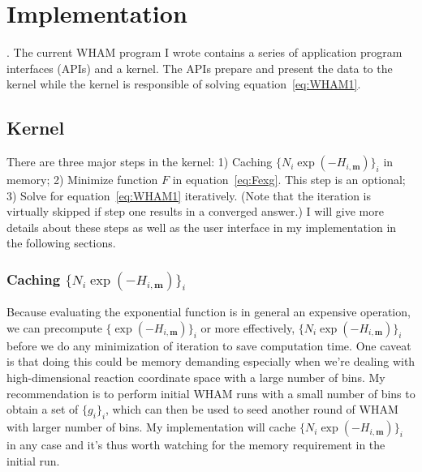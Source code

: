 \section{Implementation}
. The current WHAM
program I wrote contains a series of application program interfaces (APIs) and
a kernel. The APIs prepare and present the data to the kernel while the kernel
is responsible of solving equation~\ref{eq:WHAM1}.

\subsection{Kernel}
There are three major steps in the kernel: 
1) Caching $\{N_{i}\exp(-H_{i,\mathbf{m}})\}_{i}$ in memory;
2) Minimize function $F$ in equation~\ref{eq:Fexg}. This step is an optional;
3) Solve for equation~\ref{eq:WHAM1} iteratively. (Note that the iteration is
virtually skipped if step one results in a converged answer.) 
I will give more details about these steps as well as the user interface
in my implementation in the following sections. 

\subsubsection{Caching $\{N_{i}\exp(-H_{i,\mathbf{m}})\}_{i}$}
Because evaluating the exponential function is in general an expensive 
operation, we can precompute $\{\exp(-H_{i,\mathbf{m}})\}_{i}$ or more effectively, 
$\{N_{i}\exp(-H_{i,\mathbf{m}})\}_{i}$ before we do any minimization of iteration
to save computation time. One caveat is that doing this could be 
memory demanding especially when we're dealing with high-dimensional 
reaction coordinate space with a large number of bins. My recommendation 
is to perform initial WHAM runs with a small number of bins to obtain 
a set of $\{g_{i}\}_{i}$, which can then be used to seed another round
of WHAM with larger number of bins. My implementation will cache
$\{N_{i}\exp(-H_{i,\mathbf{m}})\}_{i}$ in any case and it's thus worth watching 
for the memory requirement in the initial run.

